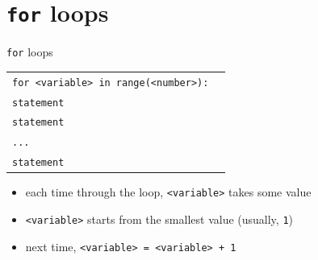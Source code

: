 \documentclass[t,handout,9pt]{beamer}
\begin{document}
\section{\texttt{for} loops}
\begin{frame}{\texttt{for} loops}
\vfill
\begin{table}[]
\begin{flushleft}
\begin{tabular}{ll}
\texttt{for <variable> in range(<number>):} &  \\
\texttt{\qquad statement}        & \\
\texttt{\qquad statement}        & \\
\texttt{\qquad ...}        & \\
\texttt{\qquad statement}        & \\
\end{tabular}
\end{flushleft}
\end{table}
\vfill
\begin{itemize}
	\item each time through the loop, \texttt{<variable>} takes some value
	\item \texttt{<variable>} starts from the smallest value (usually, \texttt{1})
	\item next time, \texttt{<variable> = <variable> + 1}
\end{itemize}
\vfill
\end{frame}
%
\end{document}
